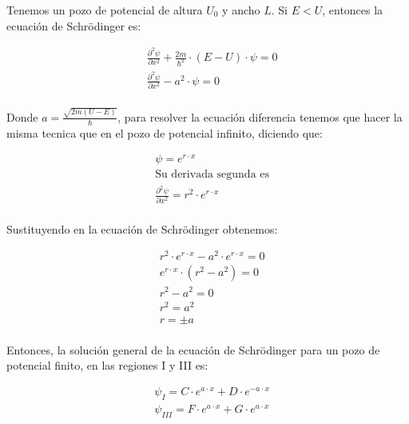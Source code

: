 \documentclass[a4paper]{article}
\begin{document}
            \indent Tenemos un pozo de potencial de altura $U_0$ y ancho $L$. Si $E < U$, entonces la ecuación de Schrödinger es:

            \begin{align*}
                &\frac{\partial^2 \psi} {\partial x^2} + \frac{2m}{\hbar^2} \cdot (E - U) \cdot \psi = 0\\
                &\frac{\partial^2 \psi} {\partial x^2} - a^2 \cdot \psi = 0\\
            \end{align*}

            \indent Donde $a = \frac{\sqrt{2m(U - E)}}{\hbar}$, para resolver la ecuación diferencia tenemos que hacer la misma tecnica que en el pozo de potencial infinito, diciendo que:

            \begin{align*}
                &\psi = e^{r \cdot x} \\
                &\text{Su derivada segunda es} \\
                &\frac{\partial^2 \psi} {\partial x^2} = r^2 \cdot e^{r \cdot x} \\
            \end{align*}

            \indent Sustituyendo en la ecuación de Schrödinger obtenemos:

            \saltoPag

            \begin{align*}
                &r^2 \cdot e^{r \cdot x} - a^2 \cdot e^{r \cdot x} = 0 \\
                &e^{r \cdot x} \cdot (r^2 - a^2) = 0 \\
                &r^2 - a^2 = 0 \\
                &r^2 = a^2 \\
                &r = \pm a \\
            \end{align*}

            \indent Entonces, la solución general de la ecuación de Schrödinger para un pozo de potencial finito, en las regiones I y III es:

            \begin{align*}
                &\psi_I = C \cdot e^{a \cdot x} + D \cdot e^{-a \cdot x} \\ 
                &\psi_{III} = F \cdot e^{a \cdot x} + G \cdot e^{a \cdot x} \\
            \end{align*}
\end{document}
